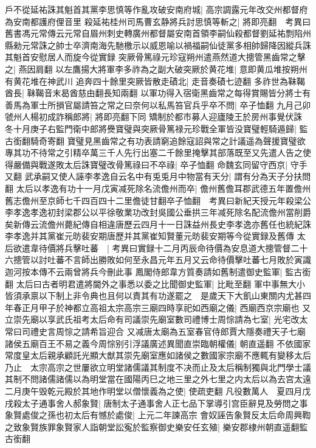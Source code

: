 戶不從延祐誅其魁首其黨李思慎等作亂攻破安南府城|{
	高宗調露元年改交州都督府為安南都護府俚音里}
殺延祐桂州司馬曹玄静將兵討思慎等斬之|{
	將即亮翻　考異曰舊書馮元常傳云元常自眉州刺史轉廣州都督屬安南首領李嗣仙殺都督劉延祐剽陷州縣勑元常誅之帥士卒濟南海先馳檄示以威恩喻以禍福嗣仙徒黨多相帥歸降因縱兵誅其魁首安慰居人而旋今從實録}
突厥骨篤祿元珍寇朔州遣燕然道大摠管黑齒常之擊之|{
	燕因肩翻}
以左鷹揚大將軍李多祚為之副大破突厥於黄花堆|{
	意即黄瓜堆按朔州有黄花堆在神武川}
追奔四十餘里突厥皆散走磧北|{
	走音奏磧七迹翻}
多祚世為靺鞨酋長|{
	靺鞨音末曷酋慈由翻長知兩翻}
以軍功得入宿衛黑齒常之每得賞賜皆分將士有善馬為軍士所損官屬請笞之常之曰奈何以私馬笞官兵乎卒不問|{
	卒子恤翻}
九月己卯虢州人楊初成詐稱郎將|{
	將即亮翻下同}
矯制於都市募人迎廬陵王於房州事覺伏誅　冬十月庚子右監門衛中郎將㸑寶璧與突厥骨篤禄元珍戰全軍皆没寶璧輕騎遁歸|{
	監古銜翻騎奇寄翻}
寶璧見黑齒常之有功表請窮追餘寇詔與常之計議遥為聲援寶璧欲專其功不待常之引精卒萬三千人先行出塞二千餘里掩擊其部落既至又先遣人告之使得嚴備與戰遂敗太后誅寶璧改骨篤祿曰不卒祿|{
	卒子恤翻}
命魏玄同留守西京|{
	守手又翻}
武承嗣又使人誣李孝逸自云名中有兎兎月中物當有天分|{
	謂有分為天子分扶問翻}
太后以孝逸有功十一月戊寅减死除名流儋州而卒|{
	儋州舊儋耳郡武德五年置儋州舊志儋州至京師七千四百四十二里儋徒甘翻卒子恤翻　考異曰新紀天授元年殺梁公李孝逸孝逸初封梁郡公以平徐敬業功改封吳國公垂拱三年减死除名配流儋州當削爵矣新傳云流儋州薨紀傳自相違唐歷云四月十一日誅益州長史李孝逸亦舊任也統紀誅李孝逸并其黨崔元昉裴安期唐歷并其黨崔知賢董元昉裴安期等今從實録及舊傳}
太后欲遣韋待價將兵擊吐蕃　|{
	考異曰實録十二月丙辰命待價為安息道大摠管督二十六摠管以討吐蕃不言師出勝敗如何至永昌元年五月又云命待價擊吐蕃七月敗於寅識迦河按本傳不云兩曾將兵今刪此事}
鳳閣侍郎韋方質奏請如舊制遣御史監軍|{
	監古銜翻}
太后曰古者明君遣將閫外之事悉以委之比聞御史監軍|{
	比毗至翻}
軍中事無大小皆須承禀以下制上非令典也且何以責其有功遂罷之　是歲天下大飢山東關内尤甚四年春正月甲子於神都立高祖太宗高宗三廟四時享祀如西廟之儀|{
	西廟西京宗廟也}
又立崇先廟以享武氏祖考太后命有司議崇先廟室數司禮博士周悰請為七室|{
	光宅改太常曰司禮史言周悰之請希旨迎合}
又减唐太廟為五室春官侍郎賈大隱奏禮天子七廟諸侯五廟百王不易之義今周悰别引浮議廣述異聞直崇臨朝權儀|{
	朝直遥翻}
不依國家常度皇太后親承顧託光顯大猷其崇先廟室應如諸侯之數國家宗廟不應輒有變移太后乃止　太宗高宗之世屢欲立明堂諸儒議其制度不决而止及太后稱制獨與北門學士議其制不問諸儒諸儒以為明堂當在國陽丙巳之地三里之外七里之内太后以為去宫太遠二月庚午毁乾元殿於其地作明堂以僧懷義為之使|{
	使疏吏翻}
凡役數萬人　夏四月戊戌殺太子通事舍人郝象賢|{
	唐制太子通事舍人正七品下掌導引宫臣辭見及勞問之事}
象賢處俊之孫也初太后有憾於處俊|{
	上元二年諫高宗}
會奴誣告象賢反太后命周興鞫之致象賢族罪象賢家人詣朝堂訟寃於監察御史樂安任玄殖|{
	樂安郡棣州朝直遥翻監古銜翻}
